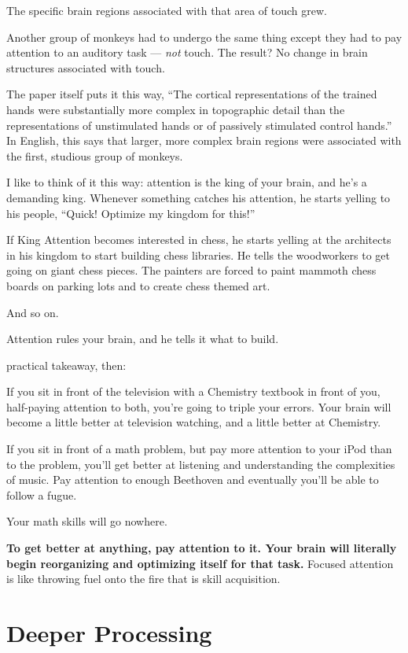 The specific brain regions associated with that area of touch grew.

Another group of monkeys had to undergo the same thing except they had to
pay attention to an auditory task --- \textit{not} touch. The result? No change in brain structures
associated with touch.

The paper itself puts it this way, ``The cortical representations of the trained
hands were substantially more complex in topographic detail than the
representations of unstimulated hands or of passively stimulated control
hands.'' In English, this says that larger, more complex brain regions were
associated with the first, studious group of monkeys.

I like to think of it this way: attention is the king of your brain, and he's a
demanding king. Whenever something catches his attention, he starts yelling to
his people, ``Quick! Optimize my kingdom for this!''

If King Attention becomes interested in chess, he starts yelling
at the architects in his kingdom to start building chess libraries. He tells the
woodworkers to get going on giant chess pieces. The painters are forced to
paint mammoth chess boards on parking lots and to create chess themed art.

And so on.

Attention rules your brain, and he tells it what to build.

 practical takeaway, then:

If you sit in front of the television with a Chemistry textbook in front of you,
half-paying attention to both, you're going to triple your errors. Your brain
will become a little better at television watching, and a little better at Chemistry.

If you sit in front of a math problem, but pay more attention to your iPod than
to the problem, you'll get better at listening and understanding the
complexities of music. Pay attention to enough Beethoven and eventually you'll
be able to follow a fugue.

Your math skills will go nowhere.

\textbf{To get better at anything, pay attention to it. Your brain will literally begin
reorganizing and optimizing itself for that task.} Focused attention is like
throwing fuel onto the fire that is skill acquisition.

\section{Deeper Processing}

